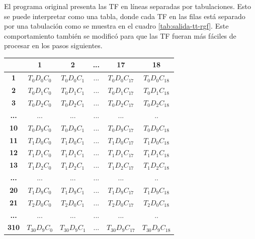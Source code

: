 \begin{enumerate}
    
    El programa original presenta las TF en líneas separadas por tabulaciones. Esto se puede interpretar como una tabla, donde cada TF en las filas está separado por una tabulación como se muestra en el cuadro \ref{tab:salida-tt-rgf}. Este comportamiento también se modificó para que las TF fueran más fáciles de procesar en los pasos siguientes.
    
    \begin{longtable}{|c|c|c|c|c|c|}
            \hline 
            & \textbf{1} & \textbf{2} & \textbf{...} & \textbf{17} & \textbf{18} \\ 
            \hline 
            \endhead
            \textbf{1} & $T_{0}D_{0}C_{0}$ & $T_{0}D_{0}C_{1}$ & ... & $T_{0}D_{0}C_{17}$ & $T_{0}D_{0}C_{18}$ \\ \hline
            \textbf{2} & $T_{0}D_{1}C_{0}$ & $T_{0}D_{1}C_{1}$ & ... & $T_{0}D_{1}C_{17}$ & $T_{0}D_{1}C_{18}$ \\ \hline
            \textbf{3} & $T_{0}D_{2}C_{0}$ & $T_{0}D_{2}C_{1}$ & ... & $T_{0}D_{2}C_{17}$ & $T_{0}D_{2}C_{18}$ \\ \hline
            \textbf{...} & ... & ... & ... & ... & .. \\ \hline
            \textbf{10} & $T_{0}D_{9}C_{0}$ & $T_{0}D_{9}C_{1}$ & ... & $T_{0}D_{9}C_{17}$ & $T_{0}D_{9}C_{18}$ \\ \hline
            \textbf{11} & $T_{1}D_{0}C_{0}$ & $T_{1}D_{0}C_{1}$ & ... & $T_{1}D_{0}C_{17}$ & $T_{1}D_{0}C_{18}$ \\ \hline
            \textbf{12} & $T_{1}D_{1}C_{0}$ & $T_{1}D_{1}C_{1}$ & ... & $T_{1}D_{1}C_{17}$ & $T_{1}D_{1}C_{18}$ \\ \hline
            \textbf{13} & $T_{1}D_{2}C_{0}$ & $T_{1}D_{2}C_{1}$ & ... & $T_{1}D_{2}C_{17}$ & $T_{1}D_{2}C_{18}$ \\ \hline
            \textbf{...} & ... & ... & ... & ... & .. \\ \hline
            \textbf{20} & $T_{1}D_{9}C_{0}$ & $T_{1}D_{9}C_{1}$ & ... & $T_{1}D_{9}C_{17}$ & $T_{1}D_{9}C_{18}$ \\ \hline
            \textbf{21} & $T_{2}D_{0}C_{0}$ & $T_{2}D_{0}C_{1}$ & ... & $T_{2}D_{0}C_{17}$ & $T_{2}D_{0}C_{18}$ \\ \hline
            \textbf{...} & ... & ... & ... & ... & .. \\ \hline
            \textbf{310} & $T_{30}D_{9}C_{0}$ & $T_{30}D_{9}C_{1}$ & ... & $T_{30}D_{9}C_{17}$ & $T_{30}D_{9}C_{18}$ \\ \hline
        

\end{longtable}
\end{enumerate}
